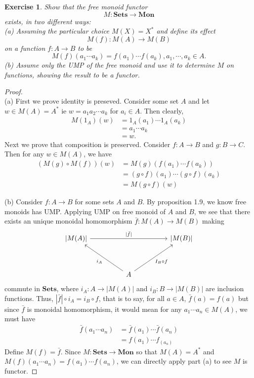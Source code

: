 \documentclass[a4paper, 11pt]{book}
\theoremstyle{plain}
\newtheorem{exercise}{Exercise}[chapter]
\theoremstyle{plain}
\newcommand{\mb}{\mathbf}
\newcommand{\arr}{\rightarrow}
\begin{document}
  \begin{exercise}
      Show that the free monoid functor $$M: \mb{Sets} \arr \mb{Mon}$$ exists, in two different ways: \\
      (a) Assuming the particular choice $M(X)=X^*$ and define its effect $$M(f):M(A) \arr M(B)$$ on a function $f:A \arr B$ to be $$M(f)(a_1 \cdots a_k)=f(a_1)\cdots f(a_k), a_1, \cdots, a_k \in A.$$ 
      (b) Assume only the UMP of the free monoid and use it to determine $M$ on functions, showing the result to be a functor.
    \end{exercise}
    \begin{proof} $ $ \\
      (a) First we prove identity is preseved. Consider some set $A$ and let $w \in M(A)=A^*$ ie $w=a_1a_2\cdots a_k$ for $a_i \in A$. Then clearly, 
      \begin{align*}
        M(1_A)(w) &=1_A(a_1)\cdots 1_A(a_k) \\
        &=a_1\cdots a_k \\
        &=w.
      \end{align*} Next we prove that composition is preserved. Consider $f:A \arr B$ and $g:B \arr C$. Then for any $w \in M(A)$, we have 
      \begin{align*}
        (M(g) \circ M(f))(w) &=M(g)(f(a_1)\cdots f(a_k)) \\
        &=(g\circ f)(a_1) \cdots (g \circ f)(a_k) \\
        &=M(g \circ f) (w)
      \end{align*}

      (b) Consider $f:A \arr B$ for some sets $A$ and $B$. By proposition 1.9, we know free monoids has UMP. Applying UMP on free monoid of $A$ and $B$, we see that there exists an unique monoidal homomorphism $\bar{f}:M(A) \arr M(B)$ making 
      \[\begin{tikzcd}
        {|M(A)|} &&&& {|M(B)|} \\
        \\
        && A
        \arrow["{|\bar{f}|}", from=1-1, to=1-5]
        \arrow["i_A", from=3-3, to=1-1]
        \arrow["I_B \circ f"', from=3-3, to=1-5]
      \end{tikzcd}\]
      commute in $\mb{Sets}$, where $i_A:A \arr |M(A)|$ and $i_B:B \arr |M(B)|$ are inclusion functions. Thus, $|\bar{f}| \circ i_A=i_B \circ f$, that is to say, for all $a \in A$, $\bar{f}(a)=f(a)$ but since $\bar{f}$ is monoidal homomorphism, it would mean for any $a_1\cdots a_n \in M(A)$, we must have 
      \begin{align*}
        \bar{f}(a_1 \cdots a_n) &= \bar{f}(a_1)\cdots \bar{f}(a_n) \\
        &=f(a_1)\cdots f_(a_n)
      \end{align*}
      Define $M(f)=\bar{f}$. Since $M:\mb{Sets} \arr \mb{Mon}$ so that $M(A)=A^*$ and $M(f)(a_1 \cdots a_n)=f(a_1)\cdots f(a_n)$, we can directly apply part (a) to see $M$ is functor.
    \end{proof}
\end{document}
